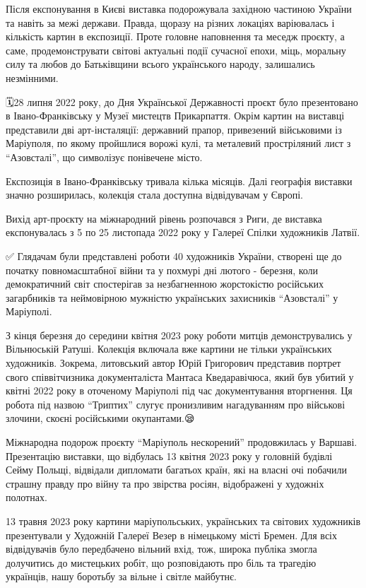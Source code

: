 Після експонування в Києві виставка подорожувала західною частиною України та
навіть за межі держави. Правда, щоразу на різних локаціях варіювалась і
кількість картин в експозиції. Проте головне наповнення та меседж проєкту, а
саме, продемонструвати світові актуальні події сучасної епохи, міць, моральну
силу та любов до Батьківщини всього українського народу, залишались незмінними.

🗓28 липня 2022 року, до Дня Української Державності проєкт було презентовано в
Івано-Франківську у Музеї мистецтв Прикарпаття. Окрім картин на виставці
представили дві арт-інсталяції: державний прапор, привезений військовими із
Маріуполя, по якому пройшлися ворожі кулі, та металевий простріляний лист з
\enquote{Азовсталі}, що символізує понівечене місто. 

Експозиція в Івано-Франківську тривала кілька місяців. Далі географія виставки
значно розширилась, колекція стала доступна відвідувачам у Європі.

Вихід арт-проєкту на міжнародний рівень розпочався з Риги, де виставка
експонувалась з 5 по 25 листопада 2022 року у Галереї Спілки художників Латвії.

✅️ Глядачам були представлені роботи 40 художників України, створені ще до
початку повномасштабної війни та у похмурі дні лютого - березня, коли
демократичний світ спостерігав за незбагненною жорстокістю російських
загарбників та неймовірною мужністю українських захисників \enquote{Азовсталі} у
Маріуполі.

З кінця березня до середини квітня 2023 року роботи митців демонструвались у
Вільнюській Ратуші. Колекція включала вже картини не тільки українських
художників. Зокрема, литовський автор Юрій Григорович представив портрет свого
співвітчизника документаліста Мантаса Кведаравічюса, який був убитий у квітні
2022 року в оточеному Маріуполі під час документування вторгнення. Ця робота
під назвою \enquote{Триптих}  слугує пронизливим нагадуванням про військові злочини,
скоєні російськими окупантами.😪

Міжнародна подорож проєкту \enquote{Маріуполь нескорений} продовжилась у Варшаві.
Презентацію виставки, що відбулась 13 квітня 2023 року у головній будівлі Сейму
Польщі, відвідали дипломати багатьох країн, які на власні очі побачили страшну
правду про війну та про звірства росіян, відображені у художніх полотнах.

13 травня 2023 року картини маріупольських, українських та світових художників
презентували у Художній Галереї Везер в німецькому місті Бремен. Для всіх
відвідувачів було передбачено вільний вхід, тож, широка публіка змогла
долучитись до мистецьких робіт, що розповідають про біль та трагедію українців,
нашу боротьбу за вільне і світле майбутнє.

